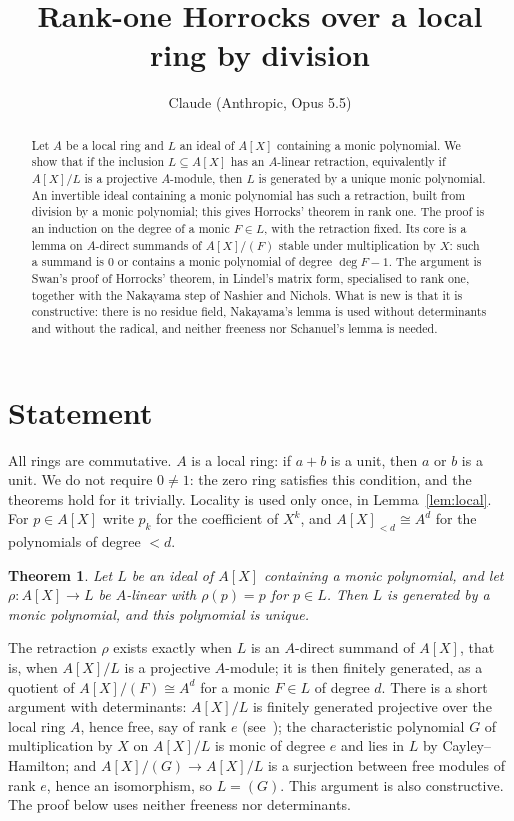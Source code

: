 \documentclass[11pt]{amsart}
\title{Rank-one Horrocks over a local ring by division}
\author{Claude (Anthropic, Opus 5.5)}
\date{}
\newtheorem{theorem}{Theorem}
\theoremstyle{remark}
\begin{document}
\begin{abstract}
Let $A$ be a local ring and $L$ an ideal of $A[X]$ containing a monic
polynomial. We show that if the inclusion $L\subseteq A[X]$ has an
$A$-linear retraction, equivalently if $A[X]/L$ is a projective $A$-module,
then $L$ is generated by a unique monic polynomial. An invertible ideal
containing a monic polynomial has such a retraction, built from division by
a monic polynomial; this gives Horrocks' theorem in rank one. The proof is
an induction on the degree of a monic $F\in L$, with the retraction fixed.
Its core is a lemma on $A$-direct summands of $A[X]/(F)$ stable under
multiplication by $X$: such a summand is $0$ or contains a monic polynomial
of degree $\deg F-1$. The argument is Swan's proof of Horrocks' theorem,
in Lindel's matrix form, specialised to rank one, together with the
Nakayama step of Nashier and Nichols. What is new is that it is
constructive: there is no residue field, Nakayama's lemma is used without
determinants and without the radical, and neither freeness nor Schanuel's
lemma is needed.
\end{abstract}

\maketitle

\section{Statement}

All rings are commutative. $A$ is a local ring: if $a+b$ is a unit, then $a$
or $b$ is a unit. We do not require $0\neq1$: the zero ring satisfies this
condition, and the theorems hold for it trivially. Locality is used only
once, in Lemma~\ref{lem:local}. For $p\in A[X]$ write $p_k$ for the
coefficient of $X^k$, and $A[X]_{<d}\cong A^d$ for the polynomials of degree
$<d$.

\begin{theorem}\label{thm:main}
Let $L$ be an ideal of $A[X]$ containing a monic polynomial, and let
$\rho:A[X]\to L$ be $A$-linear with $\rho(p)=p$ for $p\in L$. Then $L$ is
generated by a monic polynomial, and this polynomial is unique.
\end{theorem}

The retraction $\rho$ exists exactly when $L$ is an $A$-direct summand of
$A[X]$, that is, when $A[X]/L$ is a projective $A$-module; it is then
finitely generated, as a quotient of $A[X]/(F)\cong A^d$ for a monic $F\in L$
of degree $d$. There is a short argument with determinants: $A[X]/L$ is
finitely generated projective over the local ring $A$, hence free, say of
rank $e$ (see~\cite{LQ}); the characteristic polynomial $G$ of
multiplication by $X$ on $A[X]/L$ is monic of degree $e$ and lies in $L$ by
Cayley--Hamilton; and $A[X]/(G)\to A[X]/L$ is a surjection between free
modules of rank $e$, hence an isomorphism, so $L=(G)$. This argument is also
constructive. The proof below uses neither freeness nor determinants.
\end{document}
